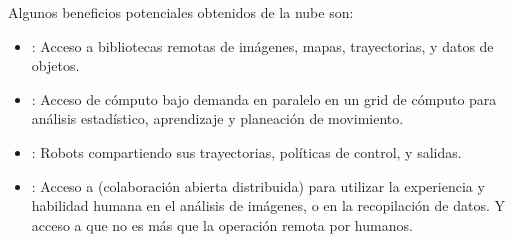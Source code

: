 Algunos beneficios potenciales obtenidos de la nube son:
\begin{itemize}
\item {} 
: Acceso a bibliotecas remotas de imágenes, mapas, trayectorias, y datos de objetos.

\item {} 
: Acceso de cómputo bajo demanda en paralelo en un grid de cómputo para análisis estadístico, aprendizaje y planeación de movimiento.

\item {} 
: Robots compartiendo sus trayectorias, políticas de control, y salidas.

\item {} 
: Acceso a  (colaboración abierta distribuida) para utilizar la experiencia y habilidad humana en el análisis de imágenes, o en la recopilación de datos. Y acceso a  que no es más que la operación remota por humanos.

\end{itemize}


